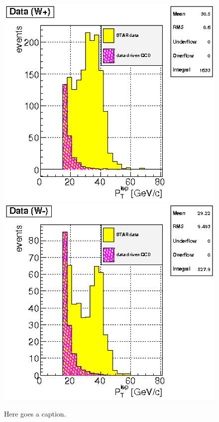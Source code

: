 \documentclass[12pt]{article}
\begin{document}
\begin{figure}[htbp]
\begin{center}
\includegraphics[scale=0.8]{images/backgrounds/plot_4c-1}
\includegraphics[scale=0.8]{images/backgrounds/plot_6c-1}
\end{center}
\caption{Here goes a caption.}
\label{fig:plot_QCD_bkd_pt15} 
\end{figure}
\end{document}
